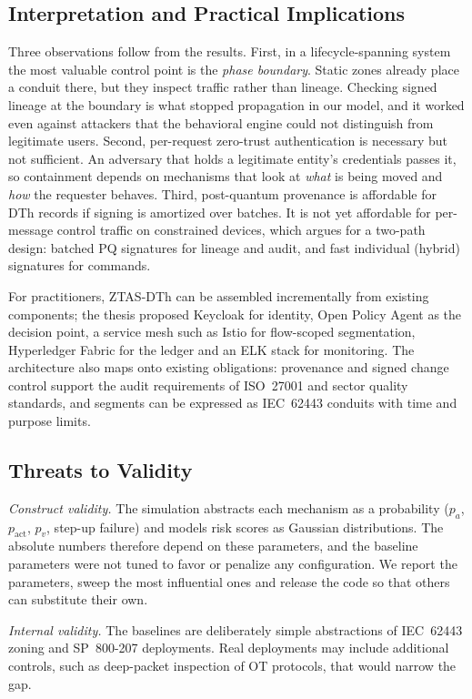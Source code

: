 \documentclass[journal]{IEEEtran}
\newcommand{\ztas}{ZTAS-DTh}
\begin{document}
\subsection{Interpretation and Practical Implications}
Three observations follow from the results. First, in a lifecycle-spanning system the most valuable control point is the \emph{phase boundary}. Static zones already place a conduit there, but they inspect traffic rather than lineage. Checking signed lineage at the boundary is what stopped propagation in our model, and it worked even against attackers that the behavioral engine could not distinguish from legitimate users. Second, per-request zero-trust authentication is necessary but not sufficient. An adversary that holds a legitimate entity's credentials passes it, so containment depends on mechanisms that look at \emph{what} is being moved and \emph{how} the requester behaves. Third, post-quantum provenance is affordable for DTh records if signing is amortized over batches. It is not yet affordable for per-message control traffic on constrained devices, which argues for a two-path design: batched PQ signatures for lineage and audit, and fast individual (hybrid) signatures for commands.

For practitioners, \ztas{} can be assembled incrementally from existing components; the thesis proposed Keycloak for identity, Open Policy Agent as the decision point, a service mesh such as Istio for flow-scoped segmentation, Hyperledger Fabric for the ledger and an ELK stack for monitoring. The architecture also maps onto existing obligations: provenance and signed change control support the audit requirements of ISO~27001 and sector quality standards, and segments can be expressed as IEC~62443 conduits with time and purpose limits.

\subsection{Threats to Validity}
\emph{Construct validity.} The simulation abstracts each mechanism as a probability ($p_a$, $p_{\mathrm{act}}$, $p_v$, step-up failure) and models risk scores as Gaussian distributions. The absolute numbers therefore depend on these parameters, and the baseline parameters were not tuned to favor or penalize any configuration. We report the parameters, sweep the most influential ones and release the code so that others can substitute their own.

\emph{Internal validity.} The baselines are deliberately simple abstractions of IEC~62443 zoning and SP~800-207 deployments. Real deployments may include additional controls, such as deep-packet inspection of OT protocols, that would narrow the gap.
\end{document}
